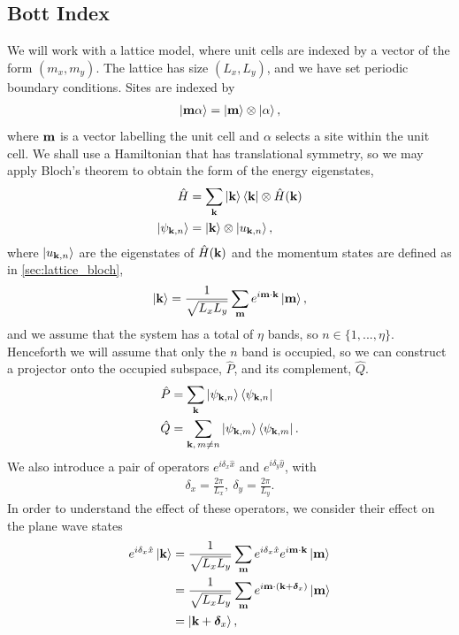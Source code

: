 \subsection{Bott Index}
We will work with a lattice model, where unit cells are indexed by a vector of the form $(m_x,m_y)$. The lattice has size $(L_x,L_y)$, and we have set periodic boundary conditions. Sites are indexed by 
\begin{align}
	\ket{\bf m \alpha} = \ket{\bf m} \otimes \ket{\alpha},
\end{align} 
where $\bf m$ is a vector labelling the unit cell and $\alpha$ selects a site within the unit cell. We shall use a Hamiltonian that has translational symmetry, so we may apply Bloch's theorem to obtain the form of the energy eigenstates,
\begin{align}
	\hat H &= \sum_{\bf k} \ket{\bf k}\bra{\bf k}\otimes \hat H(\bf k) \\ 
	\ket{\psi_{\bf k, n}} &= \ket{\bf k} \otimes\ket {u_{\bf k, n}},
\end{align}
where $\ket {u_{\bf k, n}}$ are the eigenstates of $\hat H(\bf k)$ and the momentum states are defined as in \textsection\ref{sec:lattice_bloch},
\begin{align}
	\ket{\bf k} = \frac{1}{\sqrt{L_x L_y}} \sum_{\bf m} e^{i \bf m \cdot \bf k} \ket {\bf m},
\end{align}
and we assume that the system has a total of $\eta$ bands, so $n \in  \{1,...,\eta\}$. Henceforth we will assume that only the $n$ band is occupied, so we can construct a projector onto the occupied subspace, $\hat P$, and its complement, $\hat Q$.
\begin{align}
	\hat P & = \sum_{\bf k} \ket{\psi_{\bf k, n}}\bra{\psi_{\bf k, n}} \\
	\hat Q & = \sum_{\bf k,\, m \neq n} \ket{\psi_{\bf k, m}}\bra{\psi_{\bf k, m}}.
\end{align}
We also introduce a pair of operators $e^{i \delta_x \hat x}$ and $e^{i \delta_y \hat y}$, 
with
\begin{align}
\delta_x = \frac{2\pi}{L_x} ,\  \delta_y = \frac{2\pi}{L_y}.
\end{align}
In order to understand the effect of these operators, we consider their effect on the plane wave states
\begin{align}
	e^{i \delta_x \hat x}\ket{\bf k} &= \frac{1}{\sqrt{L_x L_y}} \sum_{\bf m} e^{i \delta_x \hat x} e^{i \bf m \cdot \bf k} \ket {\bf m} \\
	& = \frac{1}{\sqrt{L_x L_y}} \sum_{\bf m} e^{i \bf m \cdot (\bf k + \boldsymbol{\delta}_x)} \ket {\bf m}\\
	& = \ket{\bf k + \boldsymbol \delta_x},
\end{align}
